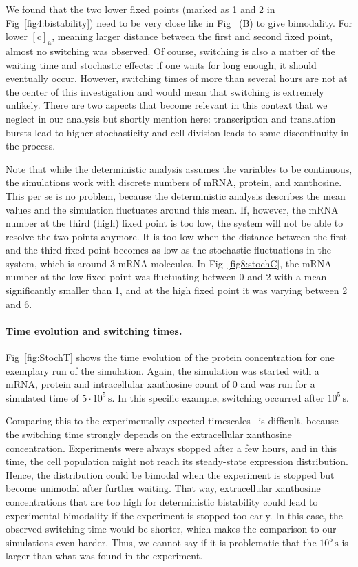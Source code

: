 \documentclass[10pt,letterpaper]{article}
\newcommand{\unit}[1]{\,\mathrm{#1}}
\newcommand{\n}[1]{\mathrm{#1}}
\newcommand\subref[2]{%
	\def\myref{\getrefnumber{#1}}%
	\hyperref[#1]{\myref\mbox{#2}}%
}
\begin{document}
	We found that the two lower fixed points (marked as 1 and 2 in
	Fig~\ref{fig4:bistability}) need to be very close like in
	Fig~\subref{fig8:stochC}{(B)} to give bimodality. For lower $\n{[c]_a}$,
	meaning larger distance between the first and second fixed point,
	almost no switching was observed. Of course, switching is also a matter of the
	waiting time and stochastic effects: if one waits for long enough, it
	should eventually occur. However, switching times of more than several hours
	are not at the center of this investigation and would mean that switching is
	extremely unlikely. There are two aspects that become relevant in this
	context that we neglect in our analysis but shortly mention here:
	transcription and translation bursts lead to higher stochasticity and cell
	division leads to some discontinuity in the process.
	
	Note that while the deterministic analysis assumes the variables to be
	continuous, the simulations work with discrete numbers of mRNA, protein, and
	xanthosine. This per se is no problem, because the deterministic analysis
	describes the mean values and the simulation fluctuates around this mean.
	If, however, the mRNA number at the third (high) fixed point is too low, the
	system will not be able to resolve the two points anymore. It is too low when the distance between the first and the third fixed point
	becomes as low as the stochastic fluctuations in the system, which is around
	3 mRNA molecules. In Fig~\ref{fig8:stochC}, the mRNA number at the low fixed
	point was fluctuating between 0 and 2 with a mean significantly smaller than
	1, and at the high fixed point it was varying between 2 and 6.
	
	\paragraph*{Time evolution and switching times.}
	Fig~\ref{fig:StochT} shows the time evolution of the protein concentration for one exemplary run of the simulation.
	Again, the simulation was started with a mRNA, protein and intracellular
	xanthosine count of 0 and was run for a simulated time of $5 \cdot 10^5
	\unit{s}$. In this specific example, switching occurred after $10^5
	\unit{s}$. 
	
	Comparing this to the experimentally expected timescales~\cite{Chure2019} is difficult,
	because the switching time strongly depends on the extracellular xanthosine
	concentration. Experiments were always stopped after a few hours, and in
	this time, the cell population might not reach its steady-state expression
	distribution. Hence, the distribution could be bimodal when the experiment
	is stopped but become unimodal after further waiting. That way,
	extracellular xanthosine concentrations that are too high for deterministic
	bistability could lead to experimental bimodality if the experiment is
	stopped too early. In this case, the observed switching time would be
	shorter, which makes the comparison to our simulations even harder. Thus, we
	cannot say if it is problematic that the $10^5 \unit{s}$ is larger than what
	was found in the experiment.
	
\end{document}
